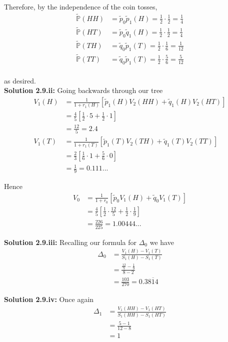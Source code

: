 \documentclass[12pt]{article}
\renewcommand{\P}{\mathbb P}
\begin{document}
Therefore, by the independence of the coin tosses,
\begin{align*}
	\tilde{\P}(HH) &= \tilde{p}_0\tilde{p}_1(H) = \frac{1}{2}\cdot\frac{1}{2} = \frac{1}{4} \\
	\tilde{\P}(HT) &= \tilde{p}_0\tilde{q}_1(H) = \frac{1}{2}\cdot\frac{1}{2} = \frac{1}{4} \\
	\tilde{\P}(TH) &= \tilde{q}_0\tilde{p}_1(T) = \frac{1}{2}\cdot\frac{1}{6} = \frac{1}{12} \\
	\tilde{\P}(TT) &= \tilde{q}_0\tilde{p}_1(T) = \frac{1}{2}\cdot\frac{5}{6} = \frac{5}{12} \\
\end{align*}

as desired. \\

{\bf Solution 2.9.ii:} Going backwards through our tree
\begin{align*}
	V_1(H) &= \frac{1}{1 + r_1(H)}[\tilde{p}_1(H)V_2(HH) + \tilde{q}_1(H)V_2(HT)] \\
	&= \frac{4}{5}\left[ \frac{1}{2}\cdot 5 + \frac{1}{2}\cdot 1 \right] \\
	&= \frac{12}{5} = 2.4 \\
	V_1(T) &= \frac{1}{1 + r_1(T)}[\tilde{p}_1(T)V_2(TH) + \tilde{q}_1(T)V_2(TT)] \\
	&= \frac{2}{3} \left[ \frac{1}{6} \cdot 1 + \frac{5}{6} \cdot 0 \right] \\
	&= \frac{1}{9} = 0.111...
\end{align*}

Hence
\begin{align*}
	V_0 &= \frac{1}{1 + r_0}[\tilde{p}_0V_1(H) + \tilde{q}_0V_1(T)] \\
	&= \frac{4}{5} \left[ \frac{1}{2} \cdot \frac{12}{5} + \frac{1}{2} \cdot \frac{1}{9} \right] \\
	&= \frac{226}{225} = 1.00444...
\end{align*}

{\bf Solution 2.9.iii:} Recalling our formula for $\Delta_0$ we have
\begin{align*}
	\Delta_0 &= \frac{ V_1(H) - V_1(T) }{ S_1(H) - S_1(T) } \\
	&= \frac{ \frac{12}{5} - \frac{1}{9} }{ 8 - 2 } \\
	&= \frac{103}{270} = 0.3\overline{814}
\end{align*}

{\bf Solution 2.9.iv:} Once again
\begin{align*}
	\Delta_1 &= \frac{ V_1(HH) - V_1(HT) }{ S_1(HH) - S_1(HT) } \\
	&= \frac{ 5 - 1 }{ 12 - 8 } \\
	&= 1
\end{align*}
\end{document}
